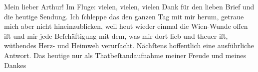 \pstart\center{}Mein lieber Arthur!\pend\vspace{0.5em}
\pstart
           Im Fluge: vielen, vielen, vielen Dank für den lieben Brief und die heutige Sendung.
               Ich ſchleppe das \label{K_L02671-1v}\label{K_L02671-1} den ganzen Tag mit mir
               herum, getraue mich aber nicht hineinzublicken, weil heut wieder einmal die Wien-Wunde offen iſt und mir jede Beſchäftigung mit dem, was mir dort lieb
               und theuer iſt, wüthendes Herz- und Heimweh verurſacht. Nächſtens hoffentlich eine
               ausführliche Antwort. Das heutige nur als Thatbeſtandaufnahme meiner Freude und
               meines Dankes{\dotsfour}\pend
           
